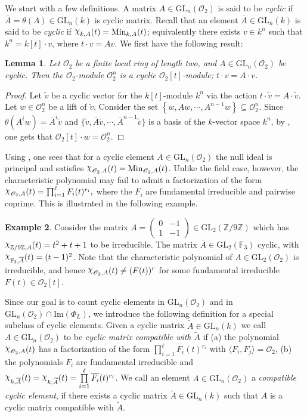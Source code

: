 \documentclass[11pt,twoside]{amsart}
\newcommand{\GL}{\mathrm{GL}}
\newcommand{\im}{\mathrm{Im}}
\newcommand{\upchi}{\raisebox{0.4ex}{$\chi$}}
\newcommand{\Char}{\upchi}
\newcommand{\Z}{\mathbb{Z}}
\newcommand{\R}{\mathscr{O}_2}
\newtheorem{lemma}{Lemma}[section]
\theoremstyle{definition} %
\newtheorem{example}[lemma]{Example}
\begin{document}
We start with a few definitions. 
A matrix $A\in \GL_n(\R)$ is said to be \emph{cyclic} if $\overline{A}=\theta(A)\in\GL_n(k)$ is cyclic matrix.
Recall that an element $\overline{A}\in\GL_n(k)$ is said to be \emph{cyclic} if $\Char_{k,A}(t)=\mathrm{Min}_{k,A}(t)$; equivalently there exists $v\in k^n$ such that $k^n=k[t]\cdot v$, where $t\cdot v=Av$.
We first have the following result:
\begin{lemma}\label{lem:cyclic-down-up}
    Let $\R$ be a finite local ring of length two, and $A\in\GL_n(\R)$ be cyclic. 
    Then the $\R$-module $\R^n$ is a cyclic $\R[t]$-module; $t\cdot v=A\cdot v$.
\end{lemma}
\begin{proof}
Let $\widetilde{v}$ be a cyclic vector for the $k[t]$-module $k^n$ via the action $t\cdot \widetilde{v}=A\cdot\widetilde{v}$.
Let $w\in\R^n$ be a lift of $\widetilde{v}$.
Consider the set $\left\{w,Aw,\cdots,A^{n-1}w\right\}\subseteq \R^n$.
Since $\theta(A^iw)=\overline{A}^i\widetilde{v}$ and $\{\widetilde{v},\overline{A}\widetilde{v},\cdots,\overline{A}^{n-1}\widetilde{v}\}$ is a basis of the $k$-vector space $k^n$, by \cite[Proposition 2.8]{AtiyahMacBook69}, one gets that $\R[t]\cdot w=\R^n$.
\end{proof}
Using , one sees that for a cyclic element $A\in\GL_n(\R)$ the null ideal is principal and satisfies 
$\Char_{\R,A}(t)=\mathrm{Min}_{\R,A}(t)$.  
Unlike the field case, however, the characteristic polynomial may fail to admit a factorization of the form  
$
\Char_{\R,A}(t)=\prod_{i=1}^\ell F_i(t)^{r_i},
$
where the $F_i$ are fundamental irreducible and pairwise coprime.
This is illustrated in the following example.
\begin{example}
    Consider the matrix $A=\begin{pmatrix}
    0&-1\\1&-1
\end{pmatrix}\in\GL_2(\Z/9\Z)$ which has $\Char_{\Z/9\Z,A}(t)=t^2+t+1$ to be irreducible.
The matrix $\overline{A}\in\GL_2(\mathbb{F}_3)$ cyclic, with $\Char_{\mathbb{F}_3,\overline{A}}(t)=(t-1)^2$.
Note that the characteristic polynomial of $A\in\GL_2(\R)$ is irreducible, and hence $\Char_{\R,A}(t)\neq(F(t))^r$ for some fundamental irreducible $F(t)\in \R[t]$.
\end{example}
Since our goal is to count cyclic elements in $\GL_n(\R)$ and in $\GL_n(\R)\cap\im(\Phi_L)$, we introduce the following definition for a special subclass of cyclic elements.
Given a cyclic matrix $\widetilde{A}\in\GL_n(k)$ we call $A\in\GL_n(\R)$ to be \emph{cyclic matrix compatible with $\widetilde{A}$} if (a) the polynomial $\Char_{\R,A}(t)$ has a factorization of the form $\prod\limits_{i=1}^{\ell}F_i(t)^{r_i}$ with $\langle F_i,F_j\rangle=\R$, (b) the polynomials $F_i$ are fundamental irreducible and $\Char_{k,\overline{A}}(t)=\Char_{k,\widetilde{A}}(t)=\prod\limits_{i=1}^\ell\overline{F_i}(t)^{r_i}$.
We call an element $A\in\GL_n(\R)$ a \emph{compatible cyclic element}, if there exists a cyclic matrix $\widetilde{A}\in\GL_n(k)$ such that $A$ is a cyclic matrix compatible with $\widetilde{A}$.
\end{document}
